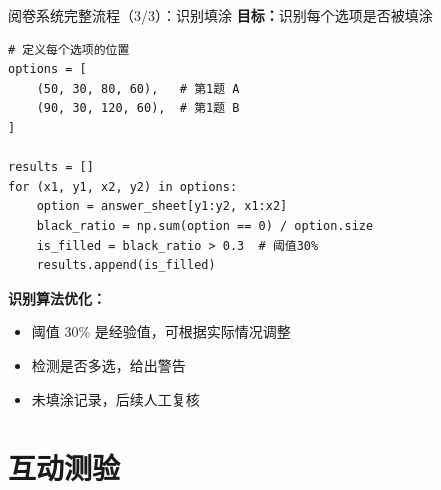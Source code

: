 \begin{frame}[fragile]{阅卷系统完整流程（3/3）：识别填涂}
    \textbf{目标：}识别每个选项是否被填涂

    \begin{lstlisting}
# 定义每个选项的位置
options = [
    (50, 30, 80, 60),   # 第1题 A
    (90, 30, 120, 60),  # 第1题 B
]

results = []
for (x1, y1, x2, y2) in options:
    option = answer_sheet[y1:y2, x1:x2]
    black_ratio = np.sum(option == 0) / option.size
    is_filled = black_ratio > 0.3  # 阈值30%
    results.append(is_filled)
    \end{lstlisting}

    \textbf{识别算法优化：}
    \begin{itemize}
        \item 阈值 30\% 是经验值，可根据实际情况调整
        \item 检测是否多选，给出警告
        \item 未填涂记录，后续人工复核
    \end{itemize}
\end{frame}


\section{互动测验}

